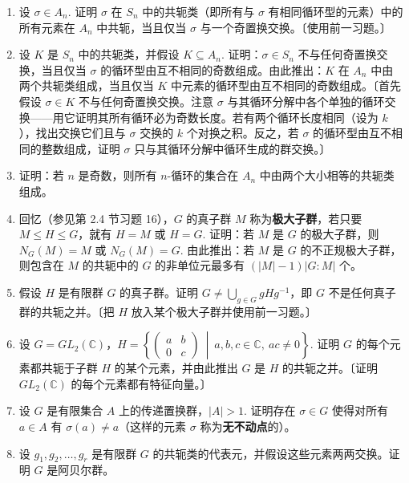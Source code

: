 \begin{enumerate}
\item 设 \(\sigma \in A_n\). 证明 \(\sigma\) 在 \(S_n\) 中的共轭类（即所有与 \(\sigma\) 有相同循环型的元素）中的所有元素在 \(A_n\) 中共轭，当且仅当 \(\sigma\) 与一个奇置换交换。〔使用前一习题。〕

\item 设 \(K\) 是 \(S_n\) 中的共轭类，并假设 \(K \subseteq A_n\). 证明：\(\sigma \in S_n\) 不与任何奇置换交换，当且仅当 \(\sigma\) 的循环型由互不相同的奇数组成。由此推出：\(K\) 在 \(A_n\) 中由两个共轭类组成，当且仅当 \(K\) 中元素的循环型由互不相同的奇数组成。〔首先假设 \(\sigma \in K\) 不与任何奇置换交换。注意 \(\sigma\) 与其循环分解中各个单独的循环交换——用它证明其所有循环必为奇数长度。若有两个循环长度相同（设为 \(k\)），找出交换它们且与 \(\sigma\) 交换的 \(k\) 个对换之积。反之，若 \(\sigma\) 的循环型由互不相同的整数组成，证明 \(\sigma\) 只与其循环分解中循环生成的群交换。〕

\item 证明：若 \(n\) 是奇数，则所有 \(n\)-循环的集合在 \(A_n\) 中由两个大小相等的共轭类组成。

\item 回忆（参见第 2.4 节习题 16），\(G\) 的真子群 \(M\) 称为\textbf{极大子群}，若只要 \(M \leq H \leq G\)，就有 \(H = M\) 或 \(H = G\). 证明：若 \(M\) 是 \(G\) 的极大子群，则 \(N_G(M) = M\) 或 \(N_G(M) = G\). 由此推出：若 \(M\) 是 \(G\) 的不正规极大子群，则包含在 \(M\) 的共轭中的 \(G\) 的非单位元最多有 \((|M| - 1)|G : M|\) 个。

\item 假设 \(H\) 是有限群 \(G\) 的真子群。证明 \(G \neq \bigcup_{g \in G} gHg^{-1}\)，即 \(G\) 不是任何真子群的共轭之并。〔把 \(H\) 放入某个极大子群并使用前一习题。〕

\item 设 \(G = GL_2(\mathbb{C})\)，\(H = \left\{ \begin{pmatrix} a & b \\ 0 & c \end{pmatrix} \ \middle|\ a, b, c \in \mathbb{C},\ ac \neq 0 \right\}\). 证明 \(G\) 的每个元素都共轭于子群 \(H\) 的某个元素，并由此推出 \(G\) 是 \(H\) 的共轭之并。〔证明 \(GL_2(\mathbb{C})\) 的每个元素都有特征向量。〕

\item 设 \(G\) 是有限集合 \(A\) 上的传递置换群，\(|A| > 1\). 证明存在 \(\sigma \in G\) 使得对所有 \(a \in A\) 有 \(\sigma(a) \neq a\)（这样的元素 \(\sigma\) 称为\textbf{无不动点}的）。

\item 设 \(g_1, g_2, \ldots, g_r\) 是有限群 \(G\) 的共轭类的代表元，并假设这些元素两两交换。证明 \(G\) 是阿贝尔群。


\end{enumerate}
